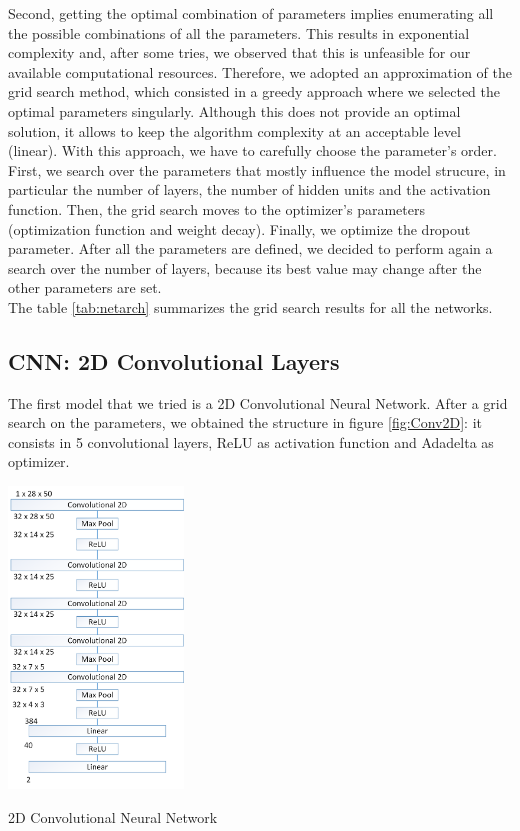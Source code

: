 \documentclass[10pt,conference,compsocconf]{IEEEtran}
\begin{document}
Second, getting the optimal combination of parameters implies enumerating all the possible combinations of all the parameters. This results in exponential complexity and, after some tries, we observed that this is unfeasible for our available computational resources. Therefore, we adopted an approximation of the grid search method, which consisted in a greedy approach where we selected the optimal parameters singularly. Although this does not provide an optimal solution, it allows to keep the algorithm complexity at an acceptable level (linear). With this approach, we have to carefully choose the parameter's order. First, we search over the parameters that mostly influence the model strucure, in particular the number of layers, the number of hidden units and the activation function. Then, the grid search moves to the optimizer's parameters (optimization function and weight decay). Finally, we optimize the dropout parameter. After all the parameters are defined, we decided to perform again a search over the number of layers, because its best value may change after the other parameters are set.\\
The table \ref{tab:netarch} summarizes the grid search results for all the networks.


\subsection{CNN: 2D Convolutional Layers}
The first model that we tried is a 2D Convolutional Neural Network. After a grid search on the parameters, we obtained the structure in figure \ref{fig:Conv2D}: it consists in 5 convolutional layers, ReLU as activation function and Adadelta as optimizer.

\begin{center}
	\captionsetup{type=figure}
	\includegraphics[width=0.35\textwidth]{img/Conv2D.png}
	\caption {2D Convolutional Neural Network}
	\label{fig:Conv2D}
\end{center}
\end{document}
